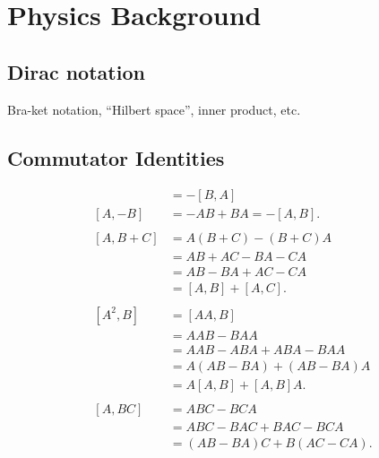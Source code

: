 \chapter{Physics Background}\label{ch:physics_background}

\section{Dirac notation}
Bra-ket notation, ``Hilbert space'', inner product, etc.

\section{Commutator Identities}
\begin{align}
    [A,B] &= -[B,A] \label{eq:BA} \\
    [A,-B] &= -AB + BA = -[A,B].\label{eq:AmB} \\
    \nonumber\\
    [A,B+C] 
        &= A(B+C) - (B+C)A \nonumber\\
        &= AB + AC - BA - CA \nonumber\\
        &= AB - BA + AC - CA \nonumber\\
        &= [A,B] + [A,C]. \label{eq:ABpC} \\
    \nonumber\\
    [A^2,B] 
        &= [AA,B] \nonumber\\
        &= AAB - BAA \nonumber\\
        &= AAB - ABA + ABA - BAA \nonumber\\
        &= A(AB-BA) + (AB-BA)A \nonumber\\
        &= A[A,B] + [A,B]A.\label{eq:A2B}\\
    \nonumber\\
    [A,BC]
        &= ABC - BCA \nonumber\\
        &= ABC - BAC + BAC - BCA \nonumber\\
        &= (AB - BA)C + B(AC - CA).\label{eq:ABC}
\end{align}

